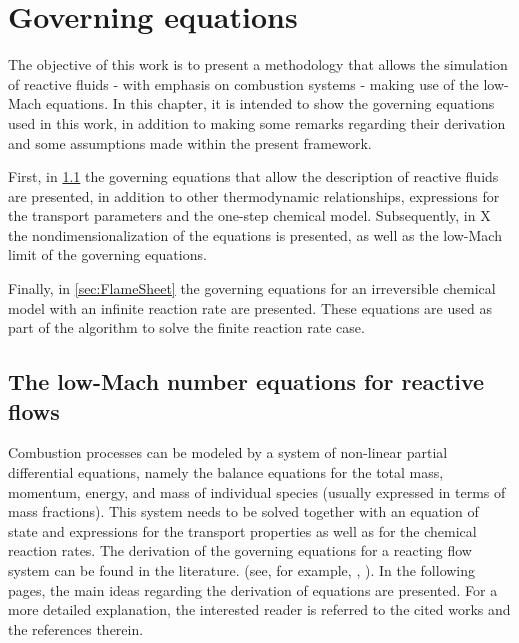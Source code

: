 \chapter{Governing equations}	\label{ch:gov_eqs}
\glsresetall
The objective of this work is to present a methodology that allows the simulation of reactive fluids - with emphasis on combustion systems - making use of the low-Mach equations.  In this chapter, it is intended to show the governing equations used in this work, in addition to making some remarks regarding their derivation and some assumptions made within the present framework.


First, in \cref{sec:GovEqLowMach} the governing equations that allow the description of reactive fluids are presented, in addition to other thermodynamic relationships, expressions for the transport parameters and the one-step chemical model. Subsequently, in X the nondimensionalization of the equations is presented, as well as the low-Mach limit of the governing equations.

Finally, in \cref{sec:FlameSheet} the governing equations for an irreversible chemical model with an infinite reaction rate are presented. These equations are used as part of the algorithm to solve the finite reaction rate case.



\section{The low-Mach number equations for reactive flows} \label{sec:GovEqLowMach}
Combustion processes can be modeled by a system of non-linear partial differential equations, namely the balance equations for the total mass, momentum, energy, and mass of individual species (usually expressed in terms of mass fractions). This system needs to be solved together with an equation of state and expressions for the transport properties as well as for the chemical reaction rates.
The derivation of the governing equations for a reacting flow system can be found in the literature. (see, for example, \citep{keeChemicallyReactingFlow2003}, \citep{poinsotTheoreticalNumericalCombustion2005}). In the following pages, the main ideas regarding the derivation of equations are presented. For a more detailed explanation,  the interested reader is referred to the cited works and the references therein.

